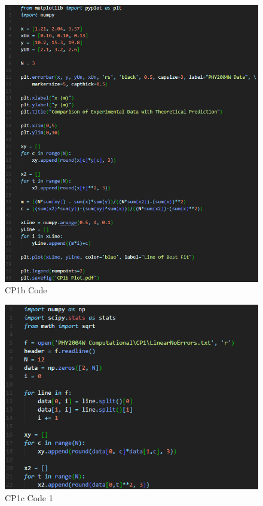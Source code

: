\documentclass[12pt]{article}
\begin{document}
    \begin{figure}[H]
        \begin{center}
           \includegraphics[scale=0.7]{CP1b code.png}
           \caption{CP1b Code}
           \label{Appendix 2}
        \end{center}
    \end{figure}

    \begin{figure}[H]
        \begin{center}
           \includegraphics[scale=0.7]{CP1c code 1.png}
           \caption{CP1c Code 1}
           \label{Appendix 3}
        \end{center}
    \end{figure}
    
\end{document}

